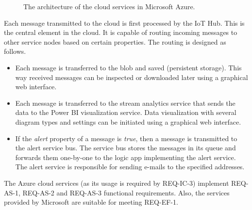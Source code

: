 \documentclass[a4paper, 11pt]{article}
\begin{document}
	\begin{figure}[h!]
		\center
		\caption{The architecture of the cloud services in Microsoft Azure.}
		\label{fig:azure-cloud}
	\end{figure}
	
	Each message transmitted to the cloud is first processed by the IoT Hub. This is the central element in the cloud. It is 	capable of routing incoming messages to other service nodes based on certain properties. The routing is designed as follows.
	 \begin{itemize}
	 	\item Each message is transferred to the blob and saved (persistent storage). This way received messages can be inspected or downloaded later using a graphical web interface.
		\item Each message is transferred to the stream analytics service that sends the data to the Power BI visualization service. Data visualization with several diagram types and settings can be initiated using a graphical web interface. 
	 	\item If the \textsl{alert} property of a message is \textsl{true}, then a message is transmitted to the alert service bus. The service bus stores the messages in its queue and forwards them one-by-one to the logic app implementing the alert service. The alert service is responsible for sending e-mails to the specified addresses.
	 \end{itemize}
 
 	The Azure cloud services (as its usage is required by REQ-IC-3) implement REQ-AS-1, REQ-AS-2 and REQ-AS-3 functional requirements. Also, the services provided by Microsoft are suitable for meeting REQ-EF-1. 
	
\end{document}
